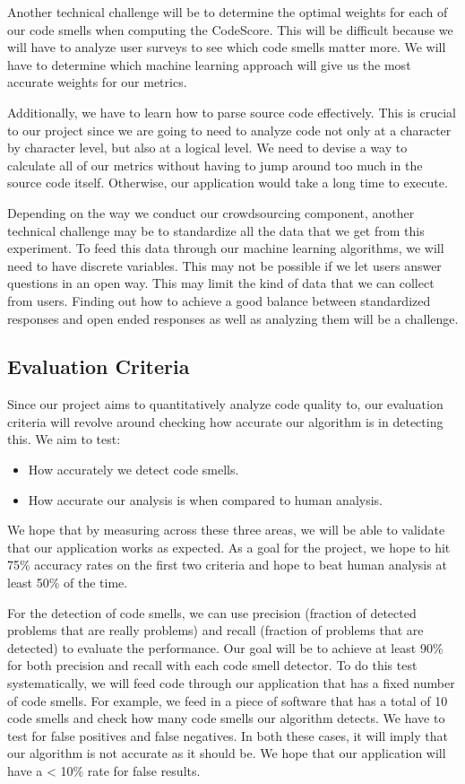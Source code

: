 \documentclass{sig-alternate}
\begin{document}
Another technical challenge will be to determine the optimal weights for each of our code smells when computing the CodeScore. This will be difficult because we will have to analyze user surveys to see which code smells matter more. We will have to determine which machine learning approach will give us the most accurate weights for our metrics. 

Additionally, we have to learn how to parse source code effectively. This is crucial to our project since we are going to need to analyze code not only at a character by character level, but also at a logical level. We need to devise a way to calculate all of our metrics without having to jump around too much in the source code itself. Otherwise, our application would take a long time to execute.

Depending on the way we conduct our crowdsourcing component, another technical challenge may be to standardize all the data that we get from this experiment. To feed this data through our machine learning algorithms, we will need to have discrete variables. This may not be possible if we let users answer questions in an open way. This may limit the kind of data that we can collect from users. Finding out how to achieve a good balance between standardized responses and open ended responses as well as analyzing them will be a challenge.

\subsection{Evaluation Criteria}
\label{subsec:eval_criteria}

Since our project aims to quantitatively analyze code quality to, our evaluation criteria will revolve around checking how accurate our algorithm is in detecting this. We aim to test:

\begin{itemize}
\item How accurately we detect code smells.
\item How accurate our analysis is when compared to human analysis.
\end{itemize}

We hope that by measuring across these three areas, we will be able to validate that our application works as expected. As a goal for the project, we hope to hit 75\% accuracy rates on the first two criteria and hope to beat human analysis at least 50\% of the time.

For the detection of code smells, we can use precision (fraction of detected problems that are really problems) and recall (fraction of problems that are detected) to evaluate the performance. Our goal will be to achieve at least 90\% for both precision and recall with each code smell detector. To do this test systematically, we will feed code through our application that has a fixed number of code smells. For example, we feed in a piece of software that has a total of 10 code smells and check how many code smells our algorithm detects. We have to test for false positives and false negatives. In both these cases, it will imply that our algorithm is not accurate as it should be. We hope that our application will have a < 10\% rate for false results. 
\end{document}
